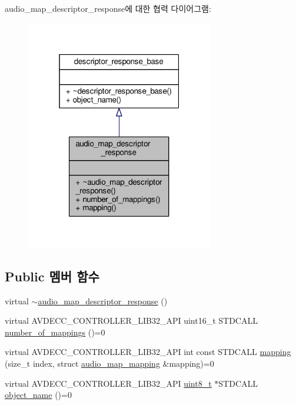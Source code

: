 audio\+\_\+map\+\_\+descriptor\+\_\+response에 대한 협력 다이어그램\+:
\nopagebreak
\begin{figure}[H]
\begin{center}
\leavevmode
\includegraphics[width=232pt]{classavdecc__lib_1_1audio__map__descriptor__response__coll__graph}
\end{center}
\end{figure}
\subsection*{Public 멤버 함수}
\begin{DoxyCompactItemize}
\item 
virtual \hyperlink{classavdecc__lib_1_1audio__map__descriptor__response_a70ece1adc13d2b0cdd7e2a48b030a023}{$\sim$audio\+\_\+map\+\_\+descriptor\+\_\+response} ()
\item 
virtual A\+V\+D\+E\+C\+C\+\_\+\+C\+O\+N\+T\+R\+O\+L\+L\+E\+R\+\_\+\+L\+I\+B32\+\_\+\+A\+PI uint16\+\_\+t S\+T\+D\+C\+A\+LL \hyperlink{classavdecc__lib_1_1audio__map__descriptor__response_afdd7d97f9329c6f6bb9646e6ac090c55}{number\+\_\+of\+\_\+mappings} ()=0
\item 
virtual A\+V\+D\+E\+C\+C\+\_\+\+C\+O\+N\+T\+R\+O\+L\+L\+E\+R\+\_\+\+L\+I\+B32\+\_\+\+A\+PI int const S\+T\+D\+C\+A\+LL \hyperlink{classavdecc__lib_1_1audio__map__descriptor__response_a5f6a0ccf54636fda2d718efab6b4abae}{mapping} (size\+\_\+t index, struct \hyperlink{structavdecc__lib_1_1audio__map__mapping}{audio\+\_\+map\+\_\+mapping} \&mapping)=0
\item 
virtual A\+V\+D\+E\+C\+C\+\_\+\+C\+O\+N\+T\+R\+O\+L\+L\+E\+R\+\_\+\+L\+I\+B32\+\_\+\+A\+PI \hyperlink{stdint_8h_aba7bc1797add20fe3efdf37ced1182c5}{uint8\+\_\+t} $\ast$S\+T\+D\+C\+A\+LL \hyperlink{classavdecc__lib_1_1descriptor__response__base_a133f7774946d80f82b8aaaa4cfbb7361}{object\+\_\+name} ()=0
\end{DoxyCompactItemize}


